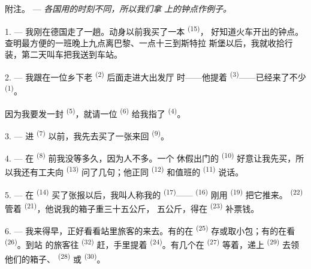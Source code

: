 
\VUsaut{4.0mm}
\VUsaut{2.4mm}
\VUsaut{3.4mm}
\textsc{附注。} --- \textit{各国用的时刻不同，所以我们拿}
\textit{上的钟点作例子。}

1. --- 我刚在德国走了一趟。动身以前我买了一本 \textsuperscript{(15)}，
好知道火车开出的钟点。查明最方便的一班晚上九点离巴黎、一点十三到斯特拉
斯堡以后，我就收拾行装，第二天叫车把我送到车站。

2. --- 我跟在一位乡下老 \textsuperscript{(2)} 后面走进大出发厅
时——他提着 \textsuperscript{(3)}——已经来了不少
\textsuperscript{(1)}。

因为我要发一封 \textsuperscript{(5)}，就请一位
\textsuperscript{(6)} 给我指了 \textsuperscript{(4)}。

3. --- 进 \textsuperscript{(7)} 以前，我先去买了一张来回
 \textsuperscript{(9)}。

4. --- 在 \textsuperscript{(8)} 前我没等多久，因为人不多。一个
休假出门的 \textsuperscript{(10)} 好意让我先买，所以我还有工夫向
 \textsuperscript{(13)} 问了几句；他正同
\textsuperscript{(12)} 和值班的 \textsuperscript{(11)} 说话。

\VUsaut{3.0mm}

5. --- 在 \textsuperscript{(14)} 买了张报以后，我叫人称我的
 \textsuperscript{(17)}—— \textsuperscript{(16)} 刚用
 \textsuperscript{(19)} 把它推来。 \textsuperscript{(22)} 管着
\textsuperscript{(21)}，他说我的箱子重三十五公斤，
五公斤，得在 \textsuperscript{(23)} 补票钱。

6. --- 我来得早，正好看看站里旅客的来去。有的在
\textsuperscript{(25)} 存或取小包；有的在看 \textsuperscript{(26)}。到站
的旅客往 \textsuperscript{(32)} 赶，手里提着
\textsuperscript{(24)}。有几个在 \textsuperscript{(27)} 等着，递上
\textsuperscript{(29)} 去领他们的箱子、 \textsuperscript{(28)} 或
 \textsuperscript{(30)}。

